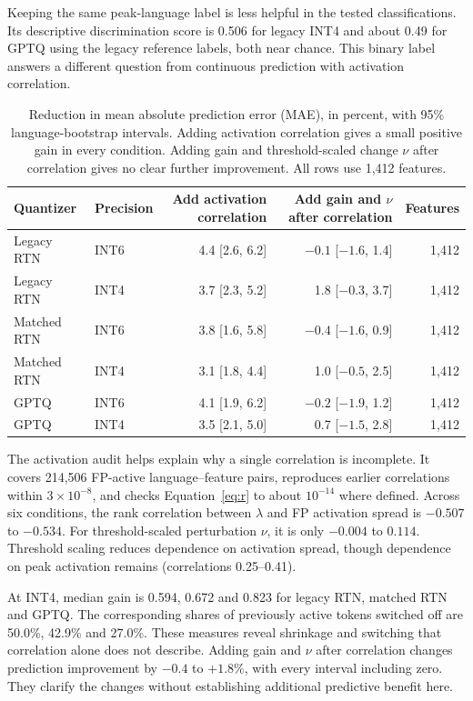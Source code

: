 \documentclass[11pt]{article}
\begin{document}
Keeping the same peak-language label is less helpful in the tested classifications. Its descriptive discrimination score is 0.506 for legacy INT4 and about 0.49 for GPTQ using the legacy reference labels, both near chance. This binary label answers a different question from continuous prediction with activation correlation.

\begin{table}[t]
\centering\small
\begin{tabular}{llrrr}
\toprule
Quantizer & Precision & Add activation correlation & Add gain and $\nu$ after correlation & Features\\
\midrule
Legacy RTN & INT6 & 4.4 [2.6, 6.2] & $-0.1$ [$-1.6$, 1.4] & 1,412\\
Legacy RTN & INT4 & 3.7 [2.3, 5.2] & 1.8 [$-0.3$, 3.7] & 1,412\\
Matched RTN & INT6 & 3.8 [1.6, 5.8] & $-0.4$ [$-1.6$, 0.9] & 1,412\\
Matched RTN & INT4 & 3.1 [1.8, 4.4] & 1.0 [$-0.5$, 2.5] & 1,412\\
GPTQ & INT6 & 4.1 [1.9, 6.2] & $-0.2$ [$-1.9$, 1.2] & 1,412\\
GPTQ & INT4 & 3.5 [2.1, 5.0] & 0.7 [$-1.5$, 2.8] & 1,412\\
\bottomrule
\end{tabular}
\caption{Reduction in mean absolute prediction error (MAE), in percent, with 95\% language-bootstrap intervals. Adding activation correlation gives a small positive gain in every condition. Adding gain and threshold-scaled change $\nu$ after correlation gives no clear further improvement. All rows use 1,412 features.}
\label{tab:prediction}
\end{table}

The activation audit helps explain why a single correlation is incomplete. It covers 214,506 FP-active language--feature pairs, reproduces earlier correlations within $3\times10^{-8}$, and checks Equation~\ref{eq:r} to about $10^{-14}$ where defined. Across six conditions, the rank correlation between $\lambda$ and FP activation spread is $-0.507$ to $-0.534$. For threshold-scaled perturbation $\nu$, it is only $-0.004$ to $0.114$. Threshold scaling reduces dependence on activation spread, though dependence on peak activation remains (correlations 0.25--0.41).

At INT4, median gain is 0.594, 0.672 and 0.823 for legacy RTN, matched RTN and GPTQ. The corresponding shares of previously active tokens switched off are 50.0\%, 42.9\% and 27.0\%. These measures reveal shrinkage and switching that correlation alone does not describe. Adding gain and $\nu$ after correlation changes prediction improvement by $-0.4$ to $+1.8$\%, with every interval including zero. They clarify the changes without establishing additional predictive benefit here.
\end{document}
